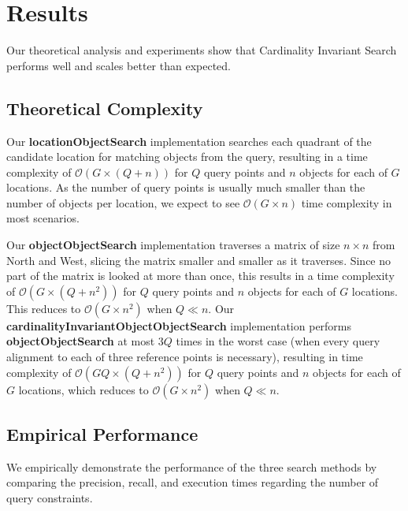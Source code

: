 \section{Results}
\label{section:results}

Our theoretical analysis and experiments show that Cardinality Invariant Search performs well and scales better than expected.

\subsection{Theoretical Complexity}
Our \textbf{locationObjectSearch} implementation searches each quadrant of the candidate location for matching objects from the query, resulting in a time complexity of $\mathcal{O}(G \times (Q + n))$ for $Q$ query points and $n$ objects for each of $G$ locations. 
As the number of query points is usually much smaller than the number of objects per location, we expect to see $\mathcal{O}(G\times n)$ time complexity in most scenarios.

Our \textbf{objectObjectSearch} implementation traverses a matrix of size $n \times n$ from North and West, slicing the matrix smaller and smaller as it traverses. 
Since no part of the matrix is looked at more than once, this results in a time complexity of $\mathcal{O}(G \times (Q + n^2))$ for $Q$ query points and $n$ objects for each of $G$ locations. 
This reduces to $\mathcal{O}(G\times n^2)$ when $Q \ll n$. 
Our \textbf{cardinalityInvariantObjectObjectSearch} implementation performs \textbf{objectObjectSearch} at most $3Q$ times in the worst case (when every query alignment to each of three reference points is necessary), resulting in time complexity of $\mathcal{O}(GQ \times (Q + n^2))$ for $Q$ query points and $n$ objects for each of $G$ locations, which reduces to $\mathcal{O}(G \times n^2)$ when $Q \ll n$. 


\subsection{Empirical Performance}
We empirically demonstrate the performance of the three search methods by comparing the precision, recall, and execution times regarding the number of query constraints. 

